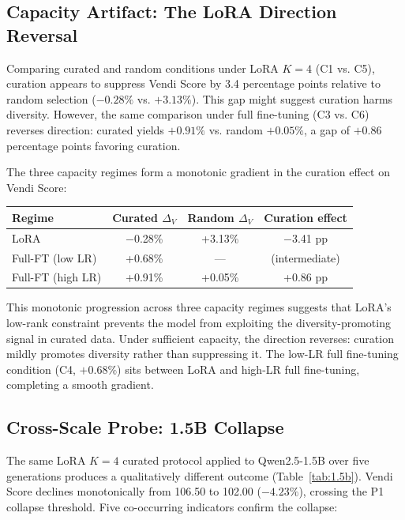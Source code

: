 \documentclass[11pt,a4paper]{article}
\begin{document}
\subsection{Capacity Artifact: The LoRA Direction Reversal}
\label{sec:reversal}

Comparing curated and random conditions under LoRA $K{=}4$ (C1 vs. C5), curation appears to suppress Vendi Score by 3.4 percentage points relative to random selection ($-0.28\%$ vs. $+3.13\%$). This gap might suggest curation harms diversity. However, the same comparison under full fine-tuning (C3 vs. C6) reverses direction: curated yields $+0.91\%$ vs. random $+0.05\%$, a gap of $+0.86$ percentage points favoring curation.

The three capacity regimes form a monotonic gradient in the curation effect on Vendi Score:

\begin{center}
\small
\begin{tabular}{lccc}
\toprule
Regime & Curated $\Delta_V$ & Random $\Delta_V$ & Curation effect \\
\midrule
LoRA & $-$0.28\% & +3.13\% & $-$3.41 pp \\
Full-FT (low LR) & +0.68\% & --- & (intermediate) \\
Full-FT (high LR) & +0.91\% & +0.05\% & +0.86 pp \\
\bottomrule
\end{tabular}
\end{center}

This monotonic progression across three capacity regimes suggests that LoRA's low-rank constraint prevents the model from exploiting the diversity-promoting signal in curated data. Under sufficient capacity, the direction reverses: curation mildly promotes diversity rather than suppressing it. The low-LR full fine-tuning condition (C4, $+0.68\%$) sits between LoRA and high-LR full fine-tuning, completing a smooth gradient.

\subsection{Cross-Scale Probe: 1.5B Collapse}
\label{sec:1.5b}

The same LoRA $K{=}4$ curated protocol applied to Qwen2.5-1.5B over five generations produces a qualitatively different outcome (Table~\ref{tab:1.5b}). Vendi Score declines monotonically from 106.50 to 102.00 ($-4.23\%$), crossing the P1 collapse threshold. Five co-occurring indicators confirm the collapse:
\end{document}
